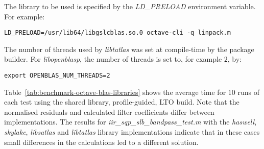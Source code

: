 \documentclass[a4paper,twoside,10pt,english]{report}
\begin{document}
The library to be used is specified by the \emph{LD\_PRELOAD} environment 
variable. For example:
\begin{small}
\begin{verbatim}
LD_PRELOAD=/usr/lib64/libgslcblas.so.0 octave-cli -q linpack.m
\end{verbatim}
\end{small}

The number of threads used by \emph{libtatlas} was set at compile-time by the
package builder. For \emph{libopenblasp}, the number of threads is set to, for 
example $2$, by:
\begin{small}
\begin{verbatim}
export OPENBLAS_NUM_THREADS=2
\end{verbatim}
\end{small}

Table~\ref{tab:benchmark-octave-blas-libraries} shows the average time for $10$
runs of each test using the shared library, profile-guided, LTO build.  Note
that the normalised residuals and calculated filter coefficients differ between
implementations. The results for \emph{iir\_sqp\_slb\_bandpass\_test.m}
with the \emph{haswell}, \emph{skylake}, \emph{libsatlas} and
\emph{libtatlas} library implementations indicate that in these cases small
differences in the calculations led to a different solution.
\end{document}
